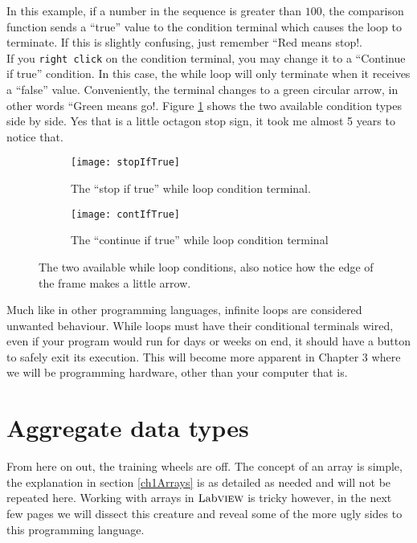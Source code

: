 In this example, if a number in the sequence is greater than $100$, the comparison function sends a ``true'' value to the condition terminal which causes the loop to terminate. If this is slightly confusing, just remember ``Red means stop!.\\

If you \texttt{right click} on the condition terminal, you may change it to a ``Continue if true'' condition. In this case, the while loop will only terminate when it receives a ``false'' value. Conveniently, the terminal changes to a green circular arrow, in other words ``Green means go!. Figure \ref{whileCond} shows the two available condition types side by side. Yes that is a little octagon stop sign, it took me almost 5 years to notice that.\\
\begin{figure} %
	\centering
	\begin{subfigure}[b]{0.40\textwidth}
		\centering
		\texttt{[image: stopIfTrue]}
		\caption{The ``stop if true'' while loop condition terminal.}
	\end{subfigure}
	\hfil
	\begin{subfigure}[b]{0.40\textwidth}
		\centering
		\texttt{[image: contIfTrue]}
		\caption{The ``continue if true'' while loop condition terminal}
	\end{subfigure}
	\caption{The two available while loop conditions, also notice how the edge of the frame makes a little arrow.}
	\label{whileCond}
\end{figure}

Much like in other programming languages, infinite loops are considered unwanted behaviour. While loops must have their conditional terminals wired, even if your program would run for days or weeks on end, it should have a button to safely exit its execution. This will become more apparent in Chapter 3 where we will be programming hardware, other than your computer that is.\\

\section{Aggregate data types}
From here on out, the training wheels are off. The concept of an array is simple, the explanation in section \ref{ch1Arrays} is as detailed as needed and will not be repeated here. Working with arrays in $\text{Lab}\textsc{view}$ is tricky however, in the next few pages we will dissect this creature and reveal some of the more ugly sides to this programming language.\\

